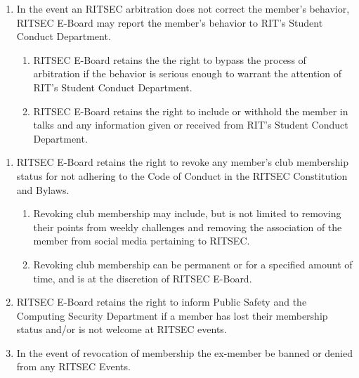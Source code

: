 
\begin{enumerate}
  \item In the event an RITSEC arbitration does not correct the member’s
    behavior, RITSEC E-Board may report the member’s behavior to RIT’s Student
    Conduct Department. 
  \begin{enumerate}
    \item RITSEC E-Board retains the the right to bypass the process of
      arbitration if the behavior is serious enough to warrant the attention of
      RIT’s Student Conduct Department.
    \item RITSEC E-Board retains the right to include or withhold the member in
      talks and any information given or received from RIT’s Student Conduct
      Department. 
  \end{enumerate}
\end{enumerate}


\begin{enumerate}
  \item RITSEC E-Board retains the right to revoke any member’s club membership
    status for not adhering to the Code of Conduct in the RITSEC Constitution
    and Bylaws. 
  \begin{enumerate}
    \item Revoking club membership may include, but is not limited to removing
      their points from weekly challenges and removing the association of the
      member from social media pertaining to RITSEC.
    \item Revoking club membership can be permanent or for a specified amount
      of time, and is at the discretion of RITSEC E-Board.
  \end{enumerate}
  \item RITSEC E-Board retains the right to inform Public Safety and the
    Computing Security Department if a member has lost their membership
    status and/or is not welcome at RITSEC events.
  \item In the event of revocation of membership the ex-member be banned or
    denied from any RITSEC Events.
\end{enumerate}


